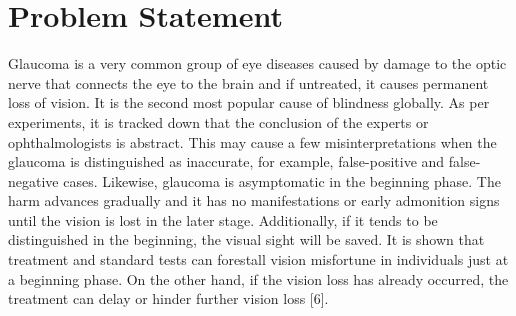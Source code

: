\section{Problem Statement} 
Glaucoma is a very common group of eye diseases caused by damage to the optic nerve that connects the eye to the brain and if untreated, it causes permanent loss of vision. It is the second most popular cause of blindness globally. As per experiments, it is tracked down that the conclusion of the experts or ophthalmologists is abstract. This may cause a few misinterpretations when the glaucoma is distinguished as inaccurate, for example, false-positive and false-negative cases. Likewise, glaucoma is asymptomatic in the beginning phase. The harm advances gradually and it has no manifestations or early admonition signs until the vision is lost in the later stage. Additionally, if it tends to be distinguished in the beginning, the visual sight will be saved. It is shown that treatment and standard tests can forestall vision misfortune in individuals just at a beginning phase. On the other hand, if the vision loss has already occurred, the treatment can delay or hinder further vision loss [6].

